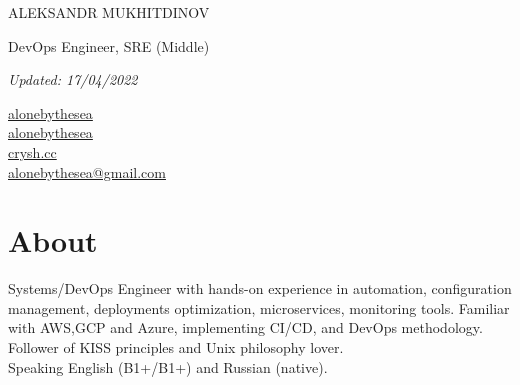 \documentclass[11pt]{letter}
\newcommand{\forceindent}{\leavevmode{\parindent=1em\indent} %
}
\begin{document}
\begin{spacing}{2}
    {\centerline{{\huge \vphantom{Name}ALEKSANDR MUKHITDINOV}}}
    {\centerline{\large \vphantom{Position}DevOps Engineer, SRE (Middle)}}
    {\centerline{\textit{Updated: 17/04/2022}}}
\end{spacing}

{\setlength{\columnsep}{-0.9cm}\begin{multicols}{4}
    \begin{spacing}{2}\rmfamily
    \large{
        \vphantom{contacts}
        \faLinkedin \href{https://www.linkedin.com/in/aleksandr-mukhitdinov/}{\vphantom{LinkedIn} alonebythesea} \\
        \columnbreak
        \faGithubAlt \href{https://github.com/alonebythesea}{\vphantom{GitHub} alonebythesea} \\
        \columnbreak
        \faLink \href{https://crysh.cc}{\vphantom{Website} crysh.cc} \\
        \columnbreak
        \faEnvelope \href{mailto:alonebythesea@gmail.com}{\vphantom{Email} alonebythesea@gmail.com} \\
        \columnbreak
    }
  \end{spacing}\end{multicols}}

\section*{About\vphantom{about}}


\forceindent Systems/DevOps Engineer with hands-on experience in automation, configuration management, deployments optimization, microservices, monitoring tools. Familiar with AWS,GCP and Azure, implementing CI/CD, and DevOps methodology. Follower of KISS principles and Unix philosophy lover. \\


\forceindent Speaking English (B1+/B1+) and Russian (native).

\end{document}
